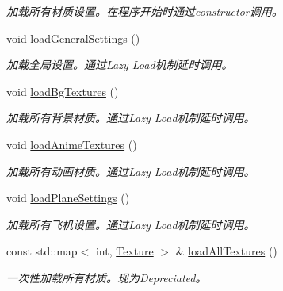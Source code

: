 \begin{DoxyCompactItemize}
\begin{DoxyCompactList}\small\item\em 加载所有材质设置。在程序开始时通过constructor调用。 \end{DoxyCompactList}\item 
\mbox{\label{class_resources_loader_aae8a0b49efa4191ba01cc832c32dbd95}} 
void \hyperlink{class_resources_loader_aae8a0b49efa4191ba01cc832c32dbd95}{load\+General\+Settings} ()
\begin{DoxyCompactList}\small\item\em 加载全局设置。通过\+Lazy Load机制延时调用。 \end{DoxyCompactList}\item 
\mbox{\label{class_resources_loader_a5099528fcfd109b389965e5ebfbdb661}} 
void \hyperlink{class_resources_loader_a5099528fcfd109b389965e5ebfbdb661}{load\+Bg\+Textures} ()
\begin{DoxyCompactList}\small\item\em 加载所有背景材质。通过\+Lazy Load机制延时调用。 \end{DoxyCompactList}\item 
\mbox{\label{class_resources_loader_afd356d180bfc92e6135996b3d290d3ae}} 
void \hyperlink{class_resources_loader_afd356d180bfc92e6135996b3d290d3ae}{load\+Anime\+Textures} ()
\begin{DoxyCompactList}\small\item\em 加载所有动画材质。通过\+Lazy Load机制延时调用。 \end{DoxyCompactList}\item 
\mbox{\label{class_resources_loader_a56b70b8ad03c9fde2736d425adfd97e7}} 
void \hyperlink{class_resources_loader_a56b70b8ad03c9fde2736d425adfd97e7}{load\+Plane\+Settings} ()
\begin{DoxyCompactList}\small\item\em 加载所有飞机设置。通过\+Lazy Load机制延时调用。 \end{DoxyCompactList}\item 
\mbox{\label{class_resources_loader_afe684ff2f1419210e4bbd608c67ffeb3}} 
const std\+::map$<$ int, \hyperlink{struct_texture}{Texture} $>$ \& \hyperlink{class_resources_loader_afe684ff2f1419210e4bbd608c67ffeb3}{load\+All\+Textures} ()
\begin{DoxyCompactList}\small\item\em 一次性加载所有材质。现为\+Depreciated。 \end{DoxyCompactList}\end{DoxyCompactItemize}
